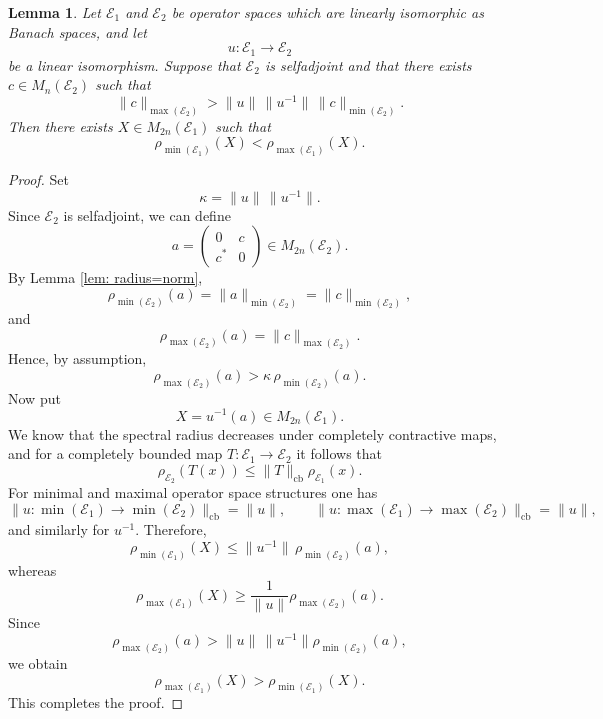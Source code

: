 \documentclass[10pt,a4paper]{amsart}
\newtheorem{lemma}{Lemma}
\newcommand{\cE}{\mathcal{E}}
\begin{document}
\begin{lemma}\label{lem: radii linear isomorphism}
    Let $\cE_1$ and $\cE_2$ be operator spaces which are linearly isomorphic as Banach spaces, and let
  \[
    u:\cE_1\to \cE_2
  \]
be a linear isomorphism. Suppose that $\cE_2$ is selfadjoint and that there exists
$c\in M_n(\cE_2)$ such that
  \[
    \|c\|_{\max(\cE_2)}
    >
    \|u\|\,\|u^{-1}\|\,
    \|c\|_{\min(\cE_2)}.
  \]
Then there exists $X\in M_{2n}(\cE_1)$ such that
  \[
    \rho_{\min(\cE_1)}(X)<\rho_{\max(\cE_1)}(X).
  \]
\end{lemma}

\begin{proof}
Set
  \[
    \kappa=\|u\|\,\|u^{-1}\|.
  \]
Since $\cE_2$ is selfadjoint, we can define
  \[
    a=
    \begin{pmatrix}
    0 & c\\
    c^* & 0
    \end{pmatrix}
    \in M_{2n}(\cE_2).
  \]
By Lemma \ref{lem: radius=norm},
  \[
    \rho_{\min(\cE_2)}(a)
    =
    \|a\|_{\min(\cE_2)}
    =
    \|c\|_{\min(\cE_2)},
  \]
and
  \[
    \rho_{\max(\cE_2)}(a)
    =
    \|c\|_{\max(\cE_2)}.
  \]
Hence, by assumption,
  \[
    \rho_{\max(\cE_2)}(a)
    >
    \kappa\,\rho_{\min(\cE_2)}(a).
  \]
Now put
  \[
    X=u^{-1}(a)\in M_{2n}(\cE_1).
  \]
We know that the spectral radius decreases under completely contractive maps, and for a completely bounded map $T:\cE_1\to \cE_2$ it follows that
  \[
    \rho_{\cE_2}(T(x))
    \leq
    \|T\|_{\mathrm{cb}}\rho_{\cE_1}(x).
  \]
For minimal and maximal operator space structures one has
  \[
    \|u:\min(\cE_1)\to \min(\cE_2)\|_{\mathrm{cb}}=\|u\|,
    \qquad
    \|u:\max(\cE_1)\to \max(\cE_2)\|_{\mathrm{cb}}=\|u\|,
  \]
and similarly for $u^{-1}$. 
Therefore, 
  \[
    \rho_{\min(\cE_1)}(X)
    \leq
    \|u^{-1}\|\,\rho_{\min(\cE_2)}(a),
  \]
whereas
  \[
    \rho_{\max(\cE_1)}(X)
    \geq
    \frac{1}{\|u\|}\rho_{\max(\cE_2)}(a).
  \]
Since
  \[
    \rho_{\max(\cE_2)}(a)   
    >
    \|u\|\,\|u^{-1}\|\rho_{\min(\cE_2)}(a),
  \]
we obtain
  \[
    \rho_{\max(\cE_1)}(X)
    >
    \rho_{\min(\cE_1)}(X).
  \]
This completes the proof.
\end{proof}
\end{document}
